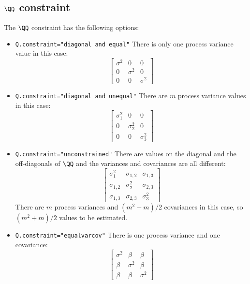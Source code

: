 \subsection{$\QQ$ constraint}

The $\QQ$ constraint has the following options:
\begin{itemize}\itemsep5pt
\item[] \texttt{Q.constraint="diagonal and equal"} There is only one process variance value in this case:
\begin{equation*}
 \left[ \begin{array}{ccc}
    \sigma^2 & 0 & 0\\
    0 & \sigma^2 & 0 \\
    0 & 0 & \sigma^2 \end{array} \right]
\end{equation*}

\item[] \texttt{Q.constraint="diagonal and unequal"}  There are $m$ process variance values in this case:  
\begin{equation*}
 \left[ \begin{array}{ccc}
    \sigma^2_1 & 0 & 0\\
    0 & \sigma^2_2 & 0 \\
    0 & 0 & \sigma^2_3 \end{array} \right]
\end{equation*}

\item[] \texttt{Q.constraint="unconstrained"} There are values on the diagonal and the off-diagonals of $\QQ$ and the variances and covariances are all different:  
\begin{equation*}
 \left[ \begin{array}{ccc}
    \sigma^2_1 & \sigma_{1,2} & \sigma_{1,3}\\
    \sigma_{1,2} & \sigma^2_2 & \sigma_{2,3} \\
    \sigma_{1,3} & \sigma_{2,3} & \sigma^2_3 \end{array} \right]
\end{equation*}
There are $m$ process variances and $(m^2-m)/2$ covariances in this case, so $(m^2+m)/2$ values to be estimated.
\item[] \texttt{Q.constraint="equalvarcov"} There is one process variance and one covariance:
\begin{equation*}
 \left[ \begin{array}{ccc}
    \sigma^2 & \beta & \beta\\
    \beta & \sigma^2 & \beta \\
    \beta & \beta & \sigma^2 \end{array} \right]
\end{equation*}
  

\end{itemize}
